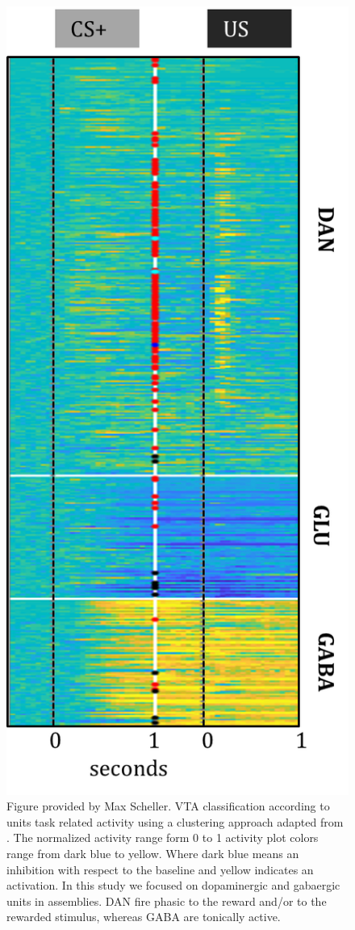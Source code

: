 \begin{figure}[H]
  \centering
    \includegraphics[scale=0.5]{figures/ClassificationUnits.png}
   \caption{Figure provided by Max Scheller. VTA classification according to units task related activity using a clustering approach adapted from \cite{Uchida}. The normalized activity range form 0 to 1 activity plot colors range from dark blue to yellow. Where dark blue means an inhibition with respect to the baseline and yellow indicates an activation. In this study we focused on dopaminergic and gabaergic units in assemblies. DAN fire phasic to the reward and/or to the rewarded stimulus, whereas GABA are tonically active.}
    \label{fig:ClassificatonVTA}
\end{figure}

